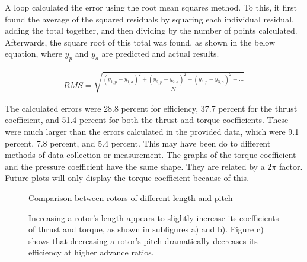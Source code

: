 \documentclass{article}
\begin{document}
A loop calculated the error using the root mean squares method. To this, it first found the average of the squared residuals by squaring each individual residual, adding the total together, and then dividing by the number of points calculated. Afterwards, the square root of this total was found, as shown in the below equation, where $y_{p}$ and $y_{a}$ are predicted and actual results. \newline

\begin{equation}
\begin{aligned}
	RMS = \sqrt{\frac{(y_{1,p}-y_{1,a})^{2} + (y_{2,p}-y_{2,a})^{2} + (y_{3,p}-y_{3,a})^{2} + ...}{N}}
\end{aligned}
\end{equation}

 The calculated errors were 28.8 percent for efficiency, 37.7 percent for the thrust coefficient, and 51.4 percent for both the thrust and torque coefficients. These were much larger than the errors calculated in the provided data, which were 9.1 percent, 7.8 percent, and 5.4 percent. This may have been do to different methods of data collection or measurement. The graphs of the torque coefficient and the pressure coefficient have the same shape. They are related by a $2 \pi$ factor. Future plots will only display the torque coefficient because of this. \newline

\begin{figure}
  \centering
  \caption{Comparison between rotors of different length and pitch}
  \captionsetup{aboveskip=0pt,font=it}
  \caption*{Increasing a rotor's length appears to slightly increase its coefficients of thrust and torque, as shown in subfigures a) and b). Figure c) shows that decreasing a rotor's pitch dramatically decreases its efficiency at higher advance ratios.}
  \label{fig:3}
\end{figure}
\end{document}
